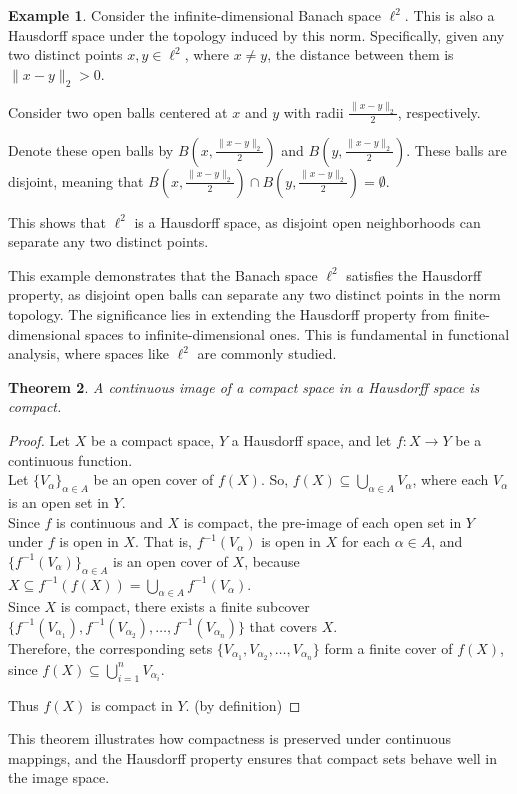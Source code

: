 \documentclass[12pt, reqno]{amsart}
\newtheorem{theorem}{Theorem}[section]
\theoremstyle{definition}
\newtheorem{example}[theorem]{Example}
\numberwithin{equation}{section}
\newcommand{\tabb}{\hspace*{1cm}}
\begin{document}
\begin{example}
Consider the infinite-dimensional Banach space $\ell^2$. This is also a Hausdorff space under the topology induced by this norm. Specifically, given any two distinct points $x, y \in \ell^2$, where $x \neq y$, the distance between them is $\|x - y\|_2 > 0$. 

Consider two open balls centered at $x$ and $y$ with radii $\frac{\|x - y\|_2}{2}$, respectively. 

Denote these open balls by $B(x, \frac{\|x - y\|_2}{2})$ and $B(y, \frac{\|x - y\|_2}{2})$. These balls are disjoint, meaning that $B(x, \frac{\|x - y\|_2}{2}) \cap B(y, \frac{\|x - y\|_2}{2}) = \emptyset$.

This shows that $\ell^2$ is a Hausdorff space, as disjoint open neighborhoods can separate any two distinct points.
\end{example}
This example demonstrates that the Banach space $\ell^2$ satisfies the Hausdorff property, as disjoint open balls can separate any two distinct points in the norm topology. The significance lies in extending the Hausdorff property from finite-dimensional spaces to infinite-dimensional ones. This is fundamental in functional analysis, where spaces like $\ell^2$ are commonly studied.


\begin{theorem}
A continuous image of a compact space in a Hausdorff space is compact.
\end{theorem}

\begin{proof}
Let $X$ be a compact space, $Y$ a Hausdorff space, and let $f: X \to Y$ be a continuous function.\\
\tabb Let $\{V_\alpha\}_{\alpha \in A}$ be an open cover of $f(X)$. So, $f(X) \subseteq \bigcup_{\alpha \in A} V_\alpha$, where each $V_\alpha$ is an open set in $Y$.\\
\tabb Since $f$ is continuous and $X$ is compact, the pre-image of each open set in $Y$ under $f$ is open in $X$. That is, $f^{-1}(V_\alpha)$ is open in $X$ for each $\alpha \in A$, and $\{ f^{-1}(V_\alpha) \}_{\alpha \in A}$ is an open cover of $X$, because $X \subseteq f^{-1}(f(X)) = \bigcup_{\alpha \in A} f^{-1}(V_\alpha)$.\\
\tabb Since $X$ is compact, there exists a finite subcover $\{ f^{-1}(V_{\alpha_1}), f^{-1}(V_{\alpha_2}), \dots, f^{-1}(V_{\alpha_n}) \}$ that covers $X$.\\
\tabb Therefore, the corresponding sets $\{ V_{\alpha_1}, V_{\alpha_2}, \dots, V_{\alpha_n} \}$ form a finite cover of $f(X)$, since $f(X) \subseteq \bigcup_{i=1}^{n} V_{\alpha_i}$.

Thus $f(X)$ is compact in $Y$. (by definition)
\end{proof}
This theorem illustrates how compactness is preserved under continuous mappings, and the Hausdorff property ensures that compact sets behave well in the image space.\\
\end{document}

